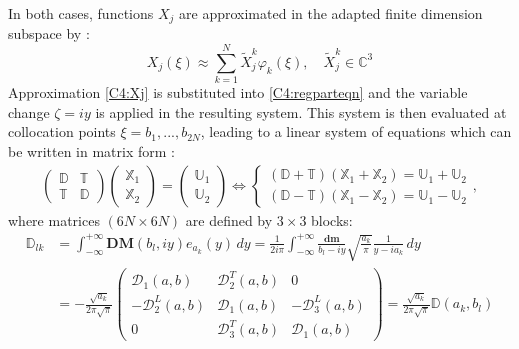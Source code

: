 In both cases, functions $X_j$ are approximated in the adapted finite dimension subspace by :
\begin{equation}
 X_j(\xi) \approx \sum_{k=1}^N \tilde{X}_j^k \varphi_k(\xi) ,\hspace{1em} \tilde{X}_j^k \in \mathbb{C}^3
 \label{C4:Xj}
\end{equation}
Approximation \eqref{C4:Xj} is substituted into \eqref{C4:regparteqn} and the variable change $\zeta=iy$ is applied in the resulting system. This system is then evaluated at collocation points $\xi=b_1,...,b_{2N}$, leading to a linear system of equations which can be written in matrix form :
\begin{eqnarray}
\begin{pmatrix}
\mathbb{D}&\mathbb{T}\\
\mathbb{T}&\mathbb{D}
\end{pmatrix}
\begin{pmatrix}
\mathbb{X}_1 \\
\mathbb{X}_2
\end{pmatrix}
=
\begin{pmatrix}
\mathbb{U}_1 \\
\mathbb{U}_2
\end{pmatrix}
\Leftrightarrow
\left\{
\begin{array}{l}
(\mathbb{D}+\mathbb{T})(\mathbb{X}_1+\mathbb{X}_2)= \mathbb{U}_1+\mathbb{U}_2 \\
(\mathbb{D}-\mathbb{T})(\mathbb{X}_1-\mathbb{X}_2)= \mathbb{U}_1-\mathbb{U}_2
\end{array}
	\right.,
\label{C4:systmat}
\end{eqnarray}
where matrices $(6N\times 6N)$ are defined by $3\times3$ blocks:
\begin{equation}
\begin{split}
\mathbb{D}_{lk}&=\int_{-\infty}^{+\infty} \textbf{DM}(b_l,iy)e_{a_k}(y) \, dy =\frac{1}{2i\pi} \int_{-\infty}^{+\infty} \frac{\mathbf{dm}}{b_l-iy} 
\sqrt{\frac{a_k}{\pi}}\frac{1}{y-ia_k} \, dy \\
&=- \frac{\sqrt{a_k}}{2\pi \sqrt{\pi}}
\begin{pmatrix}
\mathcal{D}_1(a,b) &\mathcal{D}_2^T(a,b) &0\\
-\mathcal{D}_2^L(a,b) &\mathcal{D}_1(a,b)&-\mathcal{D}_3^L(a,b)\\
0&\mathcal{D}_3^T(a,b)&\mathcal{D}_1(a,b)
\end{pmatrix}=\frac{\sqrt{a_k}}{2\pi \sqrt{\pi}}\mathbb{D}(a_k,b_l)
\end{split}
\label{C4:Dab}
\end{equation}
